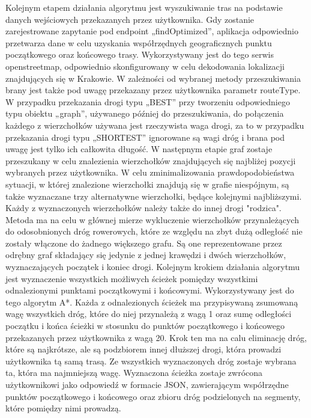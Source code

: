 Kolejnym etapem działania algorytmu jest wyszukiwanie tras na podstawie danych wejściowych przekazanych przez użytkownika. Gdy zostanie zarejestrowane zapytanie pod endpoint „findOptimized”, aplikacja odpowiednio przetwarza dane w celu uzyskania współrzędnych geograficznych punktu początkowego oraz końcowego trasy. Wykorzystywany jest do tego serwis openstreetmap, odpowiednio skonfigurowany w celu dekodowania lokalizacji znajdujących się w Krakowie. W zależności od wybranej metody przeszukiwania brany jest także pod uwagę przekazany przez użytkownika parametr routeType. W przypadku przekazania drogi typu „BEST” przy tworzeniu odpowiedniego typu obiektu „graph”, używanego później do przeszukiwania, do połączenia każdego z wierzchołków używana jest rzeczywista waga drogi, za to w przypadku przekazania drogi typu „SHORTEST” ignorowane są wagi dróg i brana pod uwagę jest tylko ich całkowita długość.\newline
W następnym etapie graf zostaje przeszukany w celu znalezienia wierzchołków znajdujących się najbliżej pozycji wybranych przez użytkownika. W celu zminimalizowania prawdopodobieństwa sytuacji, w której znalezione wierzchołki znajdują się w grafie niespójnym, są także wyznaczane trzy alternatywne wierzchołki, będące kolejnymi najbliższymi. Każdy z wyznaczonych wierzchołków należy także do innej drogi "rodzica". Metoda ma na celu w głównej mierze wykluczenie wierzchołków przynależących do odosobnionych dróg rowerowych, które ze względu na zbyt dużą odległość nie zostały włączone do żadnego większego grafu. Są one reprezentowane przez odrębny graf składający się jedynie z jednej krawędzi i dwóch wierzchołków, wyznaczających początek i koniec drogi.
Kolejnym krokiem działania algorytmu jest wyznaczenie wszystkich możliwych ścieżek pomiędzy wszystkimi odnalezionymi punktami początkowymi i końcowymi. Wykorzystywany jest do tego algorytm A*. Każda z odnalezionych ścieżek ma przypisywaną zsumowaną wagę wszystkich dróg, które do niej przynależą z wagą 1 oraz sumę odległości początku i końca ścieżki w stosunku do punktów początkowego i końcowego przekazanych przez użytkownika z wagą 20. Krok ten ma na calu eliminację dróg, które są najkrótsze, ale są podzbiorem innej dłuższej drogi, która prowadzi użytkownika tą samą trasą. Ze wszystkich wyznaczonych dróg zostaje wybrana ta, która ma najmniejszą wagę. \newline
Wyznaczona ścieżka zostaje zwrócona użytkownikowi jako odpowiedź w formacie JSON, zawierającym współrzędne punktów początkowego i końcowego oraz zbioru dróg podzielonych na segmenty, które pomiędzy nimi prowadzą.

